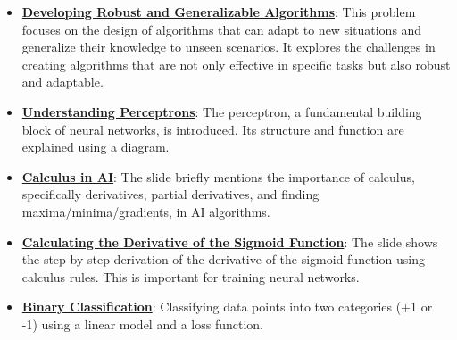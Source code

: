 \documentclass{article}%
\begin{document}
\begin{itemize}[leftmargin=*]%
\item \href{https://purdue.brightspace.com/d2l/common/assets/pdfjs-d2l-dist/1.0.14-legacy/web/viewer.html?file=\%2Fcontent\%2Fenforced\%2F1095467-wl.202510.CS.24300.001\%2F02L2-Intro.pdf\%3Fou\%3D1095467\&lang=en-us\&container=d2l-fileviewer-rendered-pdf\&fullscreen=d2l-fileviewer-rendered-pdf-dialog\&height=667#page=36}{\textbf{Developing Robust and Generalizable Algorithms}}: This problem focuses on the design of algorithms that can adapt to new situations and generalize their knowledge to unseen scenarios. It explores the challenges in creating algorithms that are not only effective in specific tasks but also robust and adaptable.%
\item \href{https://purdue.brightspace.com/d2l/common/assets/pdfjs-d2l-dist/1.0.14-legacy/web/viewer.html?file=\%2Fcontent\%2Fenforced\%2F1095467-wl.202510.CS.24300.001\%2F04L1-Linear Algebra Primer.pdf\%3Fou\%3D1095467\&lang=en-us\&container=d2l-fileviewer-rendered-pdf\&fullscreen=d2l-fileviewer-rendered-pdf-dialog\&height=667#page=17}{\textbf{Understanding Perceptrons}}: The perceptron, a fundamental building block of neural networks, is introduced. Its structure and function are explained using a diagram.%
\item \href{https://purdue.brightspace.com/d2l/common/assets/pdfjs-d2l-dist/1.0.14-legacy/web/viewer.html?file=\%2Fcontent\%2Fenforced\%2F1095467-wl.202510.CS.24300.001\%2F04L1-Linear Algebra Primer.pdf\%3Fou\%3D1095467\&lang=en-us\&container=d2l-fileviewer-rendered-pdf\&fullscreen=d2l-fileviewer-rendered-pdf-dialog\&height=667#page=19}{\textbf{Calculus in AI}}: The slide briefly mentions the importance of calculus, specifically derivatives, partial derivatives, and finding maxima/minima/gradients, in AI algorithms.%
\item \href{https://purdue.brightspace.com/d2l/common/assets/pdfjs-d2l-dist/1.0.14-legacy/web/viewer.html?file=\%2Fcontent\%2Fenforced\%2F1095467-wl.202510.CS.24300.001\%2F04L1-Linear Algebra Primer.pdf\%3Fou\%3D1095467\&lang=en-us\&container=d2l-fileviewer-rendered-pdf\&fullscreen=d2l-fileviewer-rendered-pdf-dialog\&height=667#page=21}{\textbf{Calculating the Derivative of the Sigmoid Function}}: The slide shows the step-by-step derivation of the derivative of the sigmoid function using calculus rules. This is important for training neural networks.%
\item \href{https://purdue.brightspace.com/d2l/common/assets/pdfjs-d2l-dist/1.0.14-legacy/web/viewer.html?file=\%2Fcontent\%2Fenforced\%2F1095467-wl.202510.CS.24300.001\%2F05L2-ML Basics.pdf\%3Fou\%3D1095467\&lang=en-us\&container=d2l-fileviewer-rendered-pdf\&fullscreen=d2l-fileviewer-rendered-pdf-dialog\&height=667#page=20}{\textbf{Binary Classification}}: Classifying data points into two categories (+1 or -1) using a linear model and a loss function.%

\end{itemize}
\end{document}
